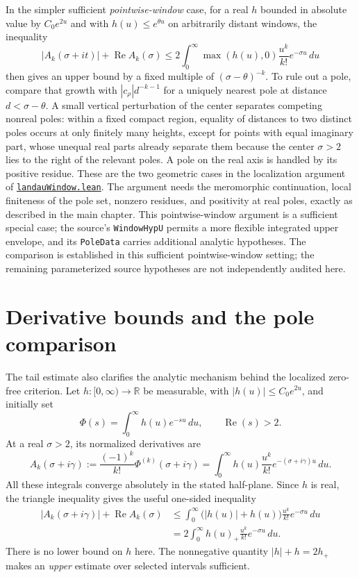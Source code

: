\documentclass[11pt,openany,oneside]{scrbook}
\theoremstyle{definition}
\theoremstyle{remark}
\newcommand{\RR}{\mathbb R}
\newcommand{\Rea}{\operatorname{Re}}
\newcommand{\baseurl}{https://github.com/CocoSgt/riemann-hypothesis-lean/blob/7cbf7a0c32fca1badf05931879a37c3f8a2b03b4/}
\newcommand{\sourcefile}[2]{\href{\baseurl#1}{\texttt{#2}}}
\begin{document}
In the simpler sufficient \emph{pointwise-window} case, for a real $h$ bounded in absolute value by $C_0e^{2u}$ and with $h(u)\le e^{\theta u}$ on arbitrarily distant windows, the inequality
\[
|A_k(\sigma+it)|+\Rea A_k(\sigma)
\le 2\int_0^\infty\max(h(u),0)\frac{u^k}{k!}e^{-\sigma u}\,du
\]
then gives an upper bound by a fixed multiple of $(\sigma-\theta)^{-k}$.  To rule out a pole, compare that growth with $|c_\rho|d^{-k-1}$ for a uniquely nearest pole at distance $d<\sigma-\theta$.  A small vertical perturbation of the center separates competing nonreal poles: within a fixed compact region, equality of distances to two distinct poles occurs at only finitely many heights, except for points with equal imaginary part, whose unequal real parts already separate them because the center $\sigma>2$ lies to the right of the relevant poles. A pole on the real axis is handled by its positive residue.  These are the two geometric cases in the localization argument of
\sourcefile{src/Development/AutomorphicArithmetic/DedekindLFunctions/LandauTheorems/landauWindow.lean}{landauWindow.lean}.  The argument needs the meromorphic continuation, local finiteness of the pole set, nonzero residues, and positivity at real poles, exactly as described in the main chapter.  This pointwise-window argument is a sufficient special case; the source's \texttt{WindowHypU} permits a more flexible integrated upper envelope, and its \texttt{PoleData} carries additional analytic hypotheses. The comparison is established in this sufficient pointwise-window setting; the remaining parameterized source hypotheses are not independently audited here.



\section{Derivative bounds and the pole comparison}\label{app:landau-derivatives}

The tail estimate also clarifies the analytic mechanism behind the localized zero-free criterion. Let $h:[0,\infty)\to\RR$ be measurable, with $|h(u)|\le C_0e^{2u}$, and initially set
\[
\Phi(s)=\int_0^\infty h(u)e^{-su}\,du,\qquad \Rea(s)>2.
\]
At a real $\sigma>2$, its normalized derivatives are
\begin{equation}\label{eq:app-landau-deriv}
 A_k(\sigma+i\gamma):=\frac{(-1)^k}{k!}\Phi^{(k)}(\sigma+i\gamma)
 =\int_0^\infty h(u)\frac{u^k}{k!}e^{-(\sigma+i\gamma)u}\,du.
\end{equation}
All these integrals converge absolutely in the stated half-plane. Since $h$ is real, the triangle inequality gives the useful one-sided inequality
\begin{equation}\label{eq:app-landau-positive}
\begin{aligned}
 |A_k(\sigma+i\gamma)|+\Rea A_k(\sigma)
 &\le\int_0^\infty\bigl(|h(u)|+h(u)\bigr)\frac{u^k}{k!}e^{-\sigma u}\,du\\
 &=2\int_0^\infty h(u)_+\frac{u^k}{k!}e^{-\sigma u}\,du.
\end{aligned}
\end{equation}
There is no lower bound on $h$ here. The nonnegative quantity $|h|+h=2h_+$ makes an \emph{upper} estimate over selected intervals sufficient.
\end{document}
